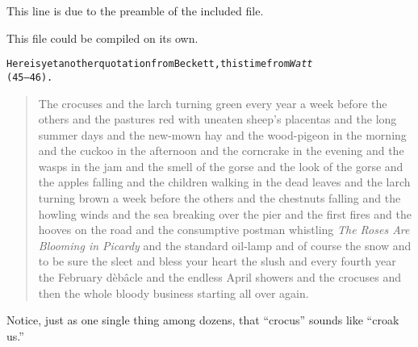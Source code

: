 \documentclass{article}
\newcommand\preamblecmd
  {This line is due to the preamble of the included file.}
\begin{document}
\tdisable
{}

\preamblecmd

This file could be compiled on its own. 

\begin{alltt}
Here is yet another quotation from Beckett, this time from \emph{Watt}
(45--46). 
\end{alltt}

\begin{quotation}
  The crocuses and the larch turning green every year a week before the others
  and the pastures red with uneaten sheep's placentas and the long summer days
  and the new-mown hay and the wood-pigeon in the morning and the cuckoo in the
  afternoon and the corncrake in the evening and the wasps in the jam and the
  smell of the gorse and the look of the gorse and the apples falling and the
  children walking in the dead leaves and the larch turning brown a week before
  the others and the chestnuts falling and the howling winds and the sea
  breaking over the pier and the first fires and the hooves on the road and the
  consumptive postman whistling \emph{The Roses Are Blooming in Picardy} and
  the standard oil-lamp and of course the snow and to be sure the sleet and
  bless your heart the slush and every fourth year the February d\`eb\^acle and
  the endless April showers and the crocuses and then the whole bloody business
  starting all over again.  
\end{quotation} 

Notice, just as one single thing among dozens, that ``crocus''
sounds like ``croak us.''  
\end{document}

